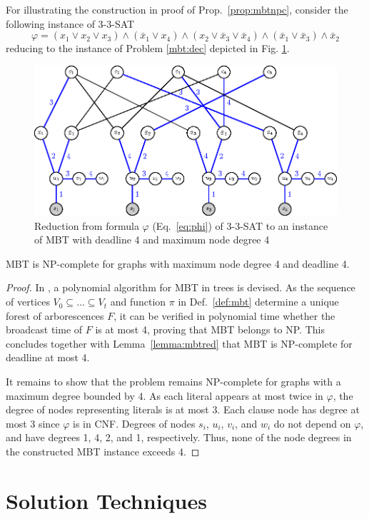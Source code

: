 For illustrating the construction in proof of Prop.~\ref{prop:mbtnpc}, consider the following instance of \textsc{3-3-SAT}
\begin{equation}
\varphi=(x_1\vee x_2\vee x_3)\wedge(\bar{x}_1\vee x_4)\wedge(x_2\vee \bar{x}_3 \vee\bar{x}_4)\wedge(\bar{x}_1\vee \bar{x}_3)\wedge \bar{x}_2 
\label{eq:phi}
\end{equation}
reducing to the instance of Problem \ref{mbt:dec} depicted in Fig. \ref{fig:mbtnpc}.
\begin{figure}
\centering
\includegraphics{figurer/mbtnpc.eps}
\caption{Reduction from formula $\varphi$ (Eq.~\eqref{eq:phi}) of \textsc{3-3-SAT} to an instance of MBT with deadline 4 and maximum node degree 4}
\label{fig:mbtnpc}
\end{figure}

\begin{proposition}
MBT is NP-complete for graphs with maximum node degree 4 and deadline 4.
\end{proposition}
\begin{proof}
In \cite{slater81}, a polynomial algorithm for MBT in trees is devised.
As the sequence of vertices $V_0\subseteq\dots\subseteq V_t$ and function $\pi$ in Def.~\ref{def:mbt} determine a unique forest of arborescences $F$,
it can be verified in polynomial time whether the broadcast time of $F$ is at most 4, proving that MBT belongs to NP.
This concludes together with Lemma~\ref{lemma:mbtred} that MBT is NP-complete for deadline at most 4.

It remains to show that the problem remains NP-complete for graphs with a maximum degree bounded by 4.
As each literal appears at most twice in $\varphi$, the degree of nodes representing literals is at most 3. 
Each clause node has degree at most 3 since $\varphi$ is in CNF.
Degrees of nodes $s_i$, $u_i$, $v_i$, and $w_i$ do not depend on $\varphi$, and have degrees 1, 4, 2, and 1, respectively.
Thus, none of the node degrees in the constructed MBT instance exceeds 4.
\end{proof}
\section{Solution Techniques}
